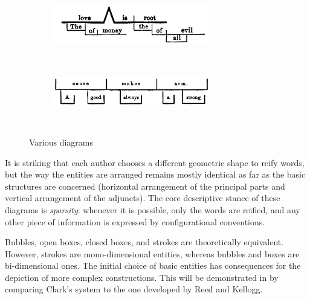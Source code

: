 \documentclass[output=paper]{langsci/langscibook}
\begin{document}
\begin{figure}
    \begin{subfigure}[t]{\linewidth}\centering
	    \caption{\citealt[265]{burtt_practical_1869}}
	  	\includegraphics[width=0.75\textwidth]{figures/04/Burtt.png}
    \end{subfigure}\medskip\\%
    \begin{subfigure}[t]{\linewidth}\centering
	    \caption{\citealt[153]{chandler__class_1862}}
	  	\includegraphics[width=0.75\textwidth]{figures/04/Chandler.png}
    \end{subfigure}\medskip\\%
    \begin{subfigure}[t]{\linewidth}\centering
	    \caption{\citealt[50]{lighthall_introduction_1872}}
    \end{subfigure}
    \caption{Various diagrams\label{fig:4:4}}
 \end{figure}

It is striking that each author chooses a different geometric shape to reify words, but the way the entities are arranged remains mostly identical as far as the basic structures are concerned (horizontal arrangement of the principal parts and vertical arrangement of the adjuncts). The core descriptive stance of these diagrams is \textit{sparsity}: whenever it is possible, only the words are reified, and any other piece of information is expressed by configurational conventions.

Bubbles, open boxes, closed boxes, and strokes are theoretically equivalent. However, strokes are mono-dimensional entities, whereas bubbles and boxes are bi-dimensional ones. The initial choice of basic entities has consequences for the depiction of more complex constructions. This will be demonstrated in  by comparing Clark’s system to the one developed by Reed and Kellogg.
\end{document}
